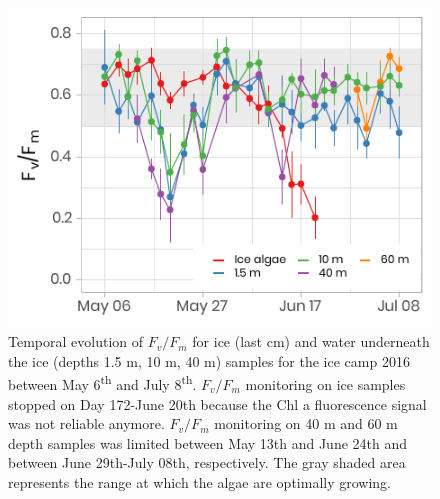 \documentclass[12pt,a4paper]{scrartcl}
\begin{document}
\clearpage
\newpage

\begin{figure}[h]
	\centering
	\includegraphics[scale = 1]{../../../graphs/fig13.pdf}
	\caption{Temporal evolution of $F_v/F_m$ for ice (last cm) and water underneath the ice (depths 1.5 m, 10 m, 40 m) samples for the ice camp 2016 between May 6\textsuperscript{th} and July 8\textsuperscript{th}. $F_v/F_m$ monitoring on ice samples stopped on Day 172-June 20th because the Chl a fluorescence signal was not reliable anymore. $F_v/F_m$ monitoring on 40 m and 60 m depth samples was limited between May 13th and June 24th and between June 29th-July 08th, respectively. The gray shaded area represents the range at which the algae are optimally growing.}
\end{figure}

\clearpage
\newpage
\end{document}
